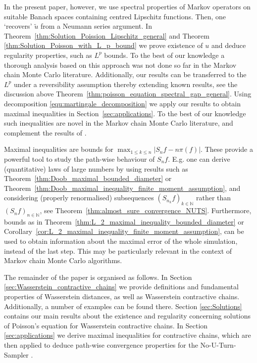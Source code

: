 \documentclass[12pt]{article}
\theoremstyle{plain}
\newcommand{\N}{\mathbb{N}}
\begin{document}
In the present paper, however, we use spectral properties of Markov operators on suitable Banach spaces containing centred Lipschitz functions. 
Then, one `recovers' $\widetilde{u}$ from a Neumann series argument. 
In Theorem~\ref{thm:Solution_Poission_Lipschitz_general} and Theorem \ref{thm:Solution_Poisson_with_L_p_bound} we prove existence of $u$ and deduce regularity properties, such as $L^p$ bounds. 
To the best of our knowledge a thorough analysis based on this approach was not done so far in the Markov chain Monte Carlo literature. 
Additionally, our results can be transferred to the $L^p$ under a reversibility assumption thereby extending known results, see the discussion above Theorem~\ref{thm:poisson_equation_spectral_gap_general}. 
Using decomposition \eqref{equ:martingale_decomposition} we apply our results to obtain maximal inequalities in Section~\ref{sec:applications}. 
To the best of our knowledge such inequalities are novel in the Markov chain Monte Carlo literature, and complement the results of \cite{ollivier2009ricci, Joulin2010Curvature,paulin2016mixing}.  

Maximal inequalities are bounds for $\max_{1 \leq k \leq n}\vert S_n f - n \pi(f)\vert $.
These provide a powerful tool to study the path-wise behaviour of $S_n f$. E.g. one can derive (quantitative) laws of large numbers by using results such as Theorem~\ref{thm:Doob_maximal_bounded_diameter} or Theorem~\ref{thm:Doob_maximal_inequality_finite_moment_assumption}, and considering (properly renormalised) subsequences $(S_{n_k} f)_{k \in \N}$ rather than $(S_n f)_{n \in \N}$, see Theorem~\ref{thm:almost_sure_convergence_NUTS}.
Furthermore, bounds as in Theorem~\ref{thm:L_2_maximal_inequality_bounded_diameter} or Corollary~\ref{cor:L_2_maximal_inequality_finite_moment_assumption}, can be used to obtain information about the maximal error of the whole simulation, instead of the last step.  
This may be particularly relevant in the context of Markov chain Monte Carlo algorithms. 

The remainder of the paper is organised as follows. 
In Section \ref{sec:Wasserstein_contractive_chains} we provide definitions and fundamental properties of Wasserstein distances, as well as Wasserstein contractive chains. Additionally, a number of examples can be found there. 
Section \ref{sec:Solutions} contains our main results about the existence and regularity concerning solutions of Poisson's equation for Wasserstein contractive chains. 
In Section \ref{sec:applications} we derive maximal inequalities for contractive chains, which are then applied to deduce path-wise convergence properties for the No-U-Turn-Sampler \cite{hoffman2014no}. 
\end{document}
